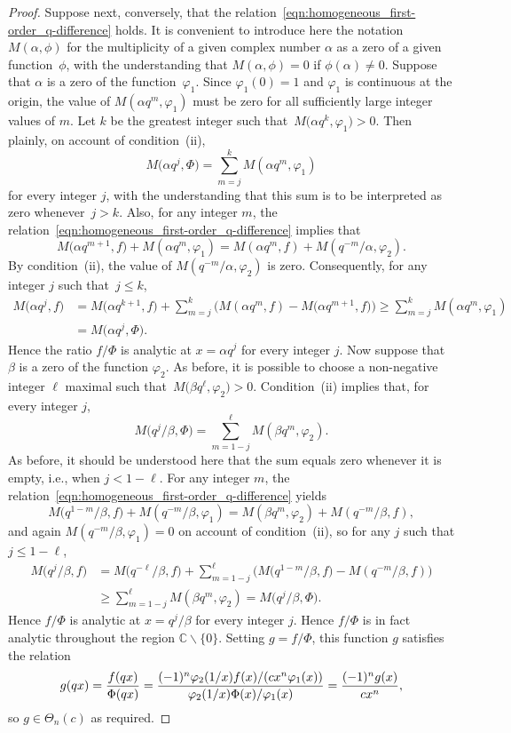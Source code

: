 \documentclass[pdftex]{sigma}
\numberwithin{equation}{section}
\newcommand{\C}{\mathbb{C}}
\begin{document}
\begin{proof}
Suppose next, conversely, that the relation~\eqref{eqn:homogeneous_first-order_q-difference} holds. It is convenient to introduce here the notation $M(\alpha,\phi)$ for the multiplicity of a given complex number $\alpha$ as a zero of a given function~$\phi$, with the understanding that $M(\alpha,\phi)=0$ if $\phi(\alpha) \neq 0$. Suppose that $\alpha$ is a zero of the function~$\varphi_1$. Since $\varphi_1(0)=1$ and $\varphi_1$ is continuous at the origin, the value of $M(\alpha q^m,\varphi_1)$ must be zero for all sufficiently large integer values of $m$. Let $k$ be the greatest integer such that~$M\bigl(\alpha q^{k},\varphi_1\bigr)>0$. Then plainly, on account of condition~(ii),
\[ M\bigl(\alpha q^j,\Phi\bigr) = \sum_{m=j}^k M(\alpha q^m,\varphi_1) \]
for every integer $j$, with the understanding that this sum is to be interpreted as zero whenever~${j>k}$. Also, for any integer $m$, the relation~\eqref{eqn:homogeneous_first-order_q-difference} implies that
\[ M\bigl(\alpha q^{m+1},f\bigr) + M(\alpha q^m,\varphi_1) = M(\alpha q^m,f) + M(q^{-m}/\alpha,\varphi_2). \]
By condition~(ii), the value of $M(q^{-m}/\alpha,\varphi_2)$ is zero. Consequently, for any integer $j$ such that~${j \leq k}$,
\begin{align*}
 M\bigl(\alpha q^j,f\bigr) &= M\bigl(\alpha q^{k+1},f\bigr) + \sum_{m=j}^{k} \bigl( M(\alpha q^m,f) - M\bigl(\alpha q^{m+1},f\bigr) \bigr) \geq \sum_{m=j}^{k} M(\alpha q^m,\varphi_1)\\
 & = M\bigl(\alpha q^j,\Phi\bigr).
 \end{align*}
Hence the ratio $f/\Phi$ is analytic at $x=\alpha q^j$ for every integer $j$. Now suppose that $\beta$ is a zero of the function $\varphi_2$. As before, it is possible to choose a non-negative integer $\ell$ maximal such that~${M\bigl(\beta q^\ell,\varphi_2\bigr)>0}$. Condition~(ii) implies that, for every integer $j$,
\[ M\bigl(q^j/\beta,\Phi\bigr) = \sum_{m=1-j}^{\ell} M(\beta q^{m},\varphi_2). \]
As before, it should be understood here that the sum equals zero whenever it is empty, i.e., when $j < 1-\ell$. For any integer $m$, the relation~\eqref{eqn:homogeneous_first-order_q-difference} yields
\[ M\bigl(q^{1-m}/\beta,f\bigr) + M(q^{-m}/\beta,\varphi_1) = M(\beta q^m,\varphi_2) + M(q^{-m}/\beta,f), \]
and again $M(q^{-m}/\beta,\varphi_1)=0$ on account of condition~(ii), so for any $j$ such that $j \leq 1-\ell$,
\begin{align*}
M\bigl(q^j/\beta,f\bigr) &= M\bigl(q^{-\ell}/\beta,f\bigr) + \sum_{m=1-j}^{\ell} \bigl( M\bigl(q^{1-m}/\beta,f\bigr) - M(q^{-m}/\beta,f) \bigr) \\
&\geq \sum_{m=1-j}^{\ell} M(\beta q^m,\varphi_2) = M\bigl(q^j/\beta,\Phi\bigr).
\end{align*}
Hence $f/\Phi$ is analytic at $x=q^j/\beta$ for every integer $j$. Hence $f/\Phi$ is in fact analytic throughout the region $\C\backslash\{0\}$. Setting $g=f/\Phi$, this function $g$ satisfies the relation
\[ g(qx) = {f(qx) \over \Phi(qx)} = {(-1)^n \varphi_2(1/x) f(x) / (cx^n \varphi_1(x)) \over \varphi_2(1/x) \Phi(x)/\varphi_1(x)} = {(-1)^n g(x) \over cx^n}, \]
so $g \in \Theta_n(c)$ as required.
\end{proof}
\end{document}
